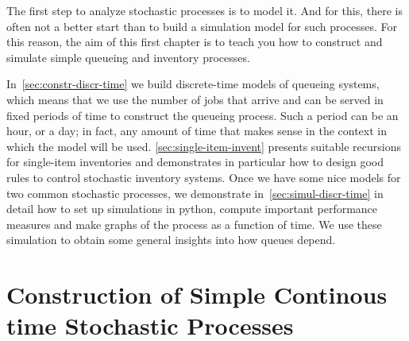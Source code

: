 The first step to analyze stochastic processes is to model it.
And for this, there is often not a better start than to build a simulation model for such processes.
For this reason, the aim of  this first chapter is to teach you how to construct and simulate simple queueing and inventory processes.

In~\cref{sec:constr-discr-time} we build discrete-time models of queueing systems, which means that we use the number of jobs that arrive and can be served in fixed periods of time to construct the queueing process.
Such a period can be an hour, or a day; in fact, any amount of time that makes sense in the context in which the model will be used.
\cref{sec:single-item-invent} presents suitable recursions for single-item inventories and demonstrates in particular how to design good rules to control stochastic inventory systems.
Once we have some nice models for two common stochastic processes, we demonstrate in~\cref{sec:simul-discr-time} in detail how to set up simulations in python, compute important performance measures and make graphs of the process as a function of time.
We use these simulation to obtain some general insights into how queues depend.





%




\chapter{Construction of Simple Continous time Stochastic Processes}
\label{cha:continuous-time}

